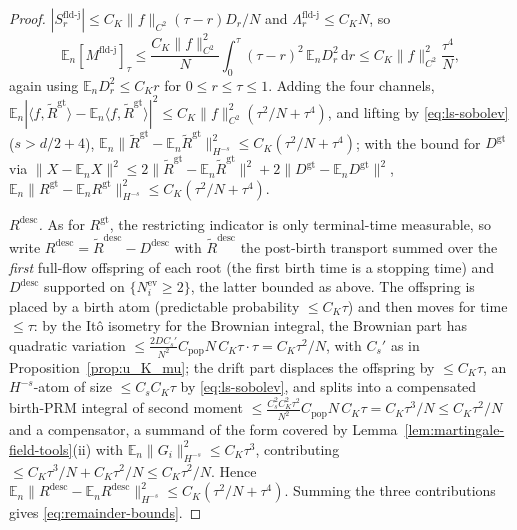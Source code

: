 \documentclass[a4paper,fleqn]{cas-sc}
\newcommand{\mhyphen}{\text{-}}
\theoremstyle{definition}
\theoremstyle{remark}
\begin{document}
\begin{proof}
$|S^{\mathrm{fld\mhyphen j}}_r|\le C_K\|f\|_{C^2}(\tau-r)D_r/N$ and $\Lambda^{\mathrm{fld\mhyphen j}}_r\le C_KN$, so
\[
\mathbb E_n[M^{\mathrm{fld\mhyphen j}}]_\tau
\le\frac{C_K\|f\|_{C^2}^2}{N}\int_0^\tau(\tau-r)^2\,\mathbb E_nD_r^2\,\mathrm dr
\le C_K\|f\|_{C^2}^2\frac{\tau^4}{N},
\]
again using $\mathbb E_nD_r^2\le C_Kr$ for $0\le r\le\tau\le1$. Adding the four channels,
$\mathbb E_n|\langle f,\widetilde R^{\mathrm{gt}}\rangle-\mathbb E_n\langle f,\widetilde R^{\mathrm{gt}}\rangle|^2\le C_K\|f\|_{C^2}^2(\tau^2/N+\tau^4)$, and lifting by
\eqref{eq:ls-sobolev} ($s>d/2+4$),
$\mathbb E_n\|\widetilde R^{\mathrm{gt}}-\mathbb E_n\widetilde R^{\mathrm{gt}}\|_{H^{-s}}^2\le C_K(\tau^2/N+\tau^4)$;
with the bound for $D^{\mathrm{gt}}$ via $\|X-\mathbb E_nX\|^2\le2\|\widetilde R^{\mathrm{gt}}-\mathbb E_n\widetilde R^{\mathrm{gt}}\|^2+2\|D^{\mathrm{gt}}-\mathbb E_nD^{\mathrm{gt}}\|^2$,
$\mathbb E_n\|R^{\mathrm{gt}}-\mathbb E_nR^{\mathrm{gt}}\|_{H^{-s}}^2\le C_K(\tau^2/N+\tau^4)$.

\emph{$R^{\mathrm{desc}}$.} As for $R^{\mathrm{gt}}$, the restricting indicator is only
terminal-time measurable, so write $R^{\mathrm{desc}}=\widetilde R^{\mathrm{desc}}-D^{\mathrm{desc}}$
with $\widetilde R^{\mathrm{desc}}$ the post-birth transport summed over the \emph{first}
full-flow offspring of each root (the first birth time is a stopping time) and
$D^{\mathrm{desc}}$ supported on $\{N^{\mathrm{ev}}_i\ge2\}$, the latter bounded as above. The
offspring is placed by a birth atom (predictable probability $\le C_K\tau$) and then moves
for time $\le\tau$: by the It\^o isometry for the Brownian integral, the Brownian part has
quadratic variation $\le\frac{2DC_s'}{N^2}C_{\mathrm{pop}}N\,C_K\tau\cdot\tau=C_K\tau^2/N$, with
$C_s'$ as in Proposition~\ref{prop:u_K_mu}; the drift part displaces the offspring by
$\le C_K\tau$, an $H^{-s}$-atom of size $\le C_sC_K\tau$ by \eqref{eq:ls-sobolev}, and splits
into a compensated birth-PRM integral of second moment
$\le\frac{C_s^2C_K^2\tau^2}{N^2}C_{\mathrm{pop}}N\,C_K\tau=C_K\tau^3/N\le C_K\tau^2/N$ and a
compensator, a summand of the form covered by Lemma~\ref{lem:martingale-field-tools}(ii) with
$\mathbb E_n\|G_i\|^2_{H^{-s}}\le C_K\tau^3$, contributing
$\le C_K\tau^3/N+C_K\tau^2/N\le C_K\tau^2/N$. Hence
$\mathbb E_n\|R^{\mathrm{desc}}-\mathbb E_nR^{\mathrm{desc}}\|_{H^{-s}}^2\le C_K(\tau^2/N+\tau^4)$.
Summing the three contributions gives \eqref{eq:remainder-bounds}.
\end{proof}
\end{document}
